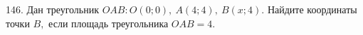 146. Дан треугольник $OAB: O(0;0),\ A(4;4),\ B(x;4).$ Найдите координаты точки $B,$ если площадь треугольника $OAB=4.$\\
